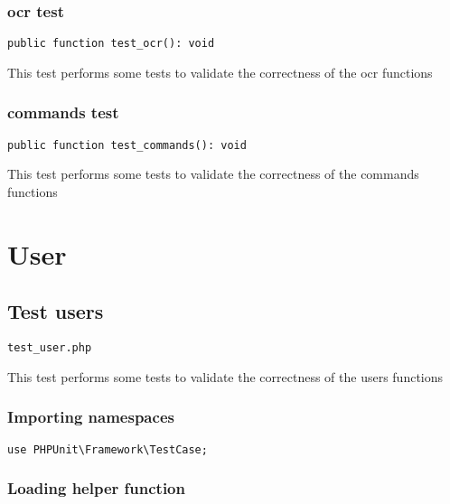 \documentclass[a4paper]{article}
\begin{document}
\hypertarget{toc402}{}
\subsubsection{ocr test}

\begin{lstlisting}
public function test_ocr(): void
\end{lstlisting}

This test performs some tests to validate the correctness
of the ocr functions

\hypertarget{toc403}{}
\subsubsection{commands test}

\begin{lstlisting}
public function test_commands(): void
\end{lstlisting}

This test performs some tests to validate the correctness
of the commands functions


\hypertarget{toc404}{}
\section{User}

\hypertarget{toc405}{}
\subsection{Test users}

\begin{lstlisting}
test_user.php
\end{lstlisting}

This test performs some tests to validate the correctness
of the users functions

\hypertarget{toc406}{}
\subsubsection{Importing namespaces}

\begin{lstlisting}
use PHPUnit\Framework\TestCase;
\end{lstlisting}

\hypertarget{toc407}{}
\subsubsection{Loading helper function}
\end{document}
